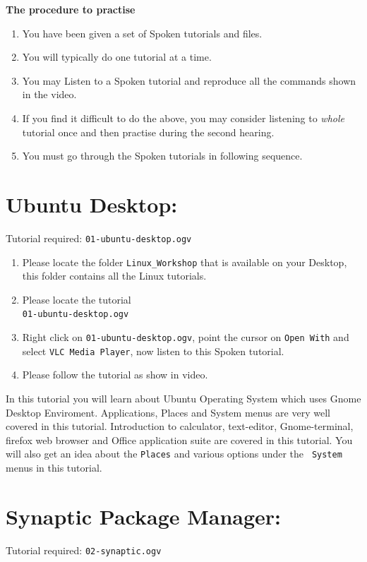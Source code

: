 \documentclass[11pt]{article}
\newenvironment{enumcpt}{\begin{enumerate} \topsep 0pt \partopsep 0pt 
                        \parsep 0pt
                        \itemsep 0pt \leftmargin -1in \rightmargin 0pt
                        }{\end{enumerate}}
\begin{document}
\begin{multicols}{2}

\textbf {The procedure to practise}
\begin{enumcpt}
\item You have been given a set of Spoken tutorials and files.
\item You will typically do one tutorial at a time.
\item You may Listen to a Spoken tutorial and reproduce all the
  commands shown in the video.
\item If you find it difficult to do the above, you may consider
  listening to \emph{whole} tutorial once and then practise during
  the second hearing.
\item You must go through the Spoken tutorials in following sequence.
\end{enumcpt}

\section{Ubuntu Desktop:}
Tutorial required: {\tt 01-ubuntu-desktop.ogv}

\begin{enumcpt}
\item Please locate the folder {\tt Linux\_Workshop} that is available
  on your Desktop, this folder contains all the Linux tutorials.
\item Please locate the tutorial \\ {\tt 01-ubuntu-desktop.ogv}
\item Right click on {\tt 01-ubuntu-desktop.ogv}, point the cursor on
  {\tt Open With} and select {\tt VLC Media Player}, now listen to
  this Spoken tutorial.
\item Please follow the tutorial as show in video.
\end{enumcpt}

 In this tutorial you will learn about Ubuntu Operating System which
 uses Gnome Desktop Enviroment. Applications, Places and System menus
 are very well covered in this tutorial. Introduction to calculator,
 text-editor, Gnome-terminal, firefox web browser and Office
 application suite are covered in this tutorial. You will also get an
 idea about the {\tt Places} and various options under the {\tt
   System} menus in this tutorial.

\section{Synaptic Package Manager:}
Tutorial required: {\tt 02-synaptic.ogv} 


\end{multicols}
\end{document}
